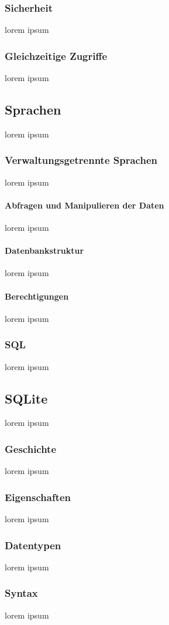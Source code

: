 \documentclass[10pt,a4paper]{report}
\begin{document}
\subsubsection{Sicherheit}
lorem ipsum
\subsubsection{Gleichzeitige Zugriffe}
lorem ipsum 
\subsection{Sprachen}
lorem ipsum
\subsubsection{Verwaltungsgetrennte Sprachen}
lorem ipsum
\paragraph{Abfragen und Manipulieren der Daten}
lorem ipsum
\paragraph{Datenbankstruktur}
lorem ipsum
\paragraph{Berechtigungen}
lorem ipsum
\subsubsection{SQL}
lorem ipsum
\subsection{SQLite}
lorem ipsum
\subsubsection{Geschichte}
lorem ipsum
\subsubsection{Eigenschaften}
lorem ipsum
\subsubsection{Datentypen}
lorem ipsum
\subsubsection{Syntax}
lorem ipsum 
\end{document}
